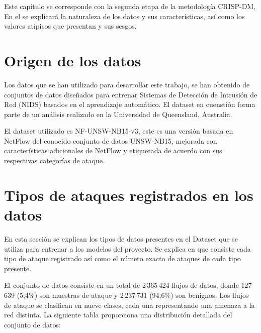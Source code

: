 Este capítulo se corresponde con la segunda etapa de la metodología CRISP-DM, En el se explicará la naturaleza de los datos y sus características, así como los valores atípicos que presentan y sus sesgos.

\section{Origen de los datos}  \label{sec.origen-datos}
Los datos que se han utilizado para desarrollar este trabajo, se han obtenido de  conjuntos de datos diseñados para entrenar Sistemas de Detección de Intrusión de Red (NIDS) basados en el aprendizaje automático. El dataset en cuenstión  forma parte de un análisis realizado en la Universidad de Queensland, Australia.\cite{luay2025NetFlowDatasetsV3}


El dataset utilizado es NF-UNSW-NB15-v3, este es una versión basada en NetFlow del conocido conjunto de datos UNSW-NB15, mejorada con características adicionales de NetFlow y etiquetada de acuerdo con sus respectivas categorías de ataque. 

\section{Tipos de ataques registrados en los datos} \label{sec.tipo-ataques}
En esta sección se explican los tipos de datos presentes en el Dataset que se utiliza para entrenar a los modelos del proyecto. Se explica en que consiste cada tipo de ataque registrado así como el número exacto de ataques de cada tipo presente.

El conjunto de datos consiste en un total de 2\,365\,424 flujos de datos, donde 127\,639 (5,4\%) son muestras de ataque y 2\,237\,731 (94,6\%) son benignos. Los flujos de ataque se clasifican en nueve clases, cada una representando una amenaza a la red distinta. La siguiente tabla proporciona una distribución detallada del conjunto de datos:

